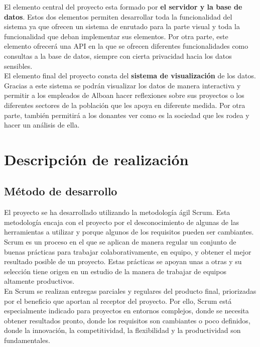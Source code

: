 El elemento central del proyecto esta formado por \textbf{el servidor y la base de datos}. Estos dos elementos permiten desarrollar toda la funcionalidad del sistema ya que ofrecen un sistema de enrutado para la parte visual y toda la funcionalidad que deban implementar sus elementos. Por otra parte, este elemento ofrecerá una API en la que se ofrecen diferentes funcionalidades como consultas a la base de datos, siempre con cierta privacidad hacia los datos sensibles.\\

El elemento final del proyecto consta del \textbf{sistema de visualización} de los datos. Gracias a este sistema se podrán visualizar los datos de manera interactiva y permitir a los empleados de Alboan hacer reflexiones sobre sus proyectos o los diferentes sectores de la población que les apoya en diferente medida. Por otra parte, también permitirá a los donantes ver como es la sociedad que les rodea y hacer un análisis de ella.

\section{Descripción de realización}

\subsection{Método de desarrollo}
El proyecto se ha desarrollado utilizando la metodología ágil Scrum. Esta metodología encaja con el proyecto por el desconocimiento de algunas de las herramientas a utilizar y porque algunos de los requisitos pueden ser cambiantes.\\

Scrum es un proceso en el que se aplican de manera regular un conjunto de buenas prácticas para trabajar colaborativamente, en equipo, y obtener el mejor resultado posible de un proyecto. Estas prácticas se apoyan unas a otras y su selección tiene origen en un estudio de la manera de trabajar de equipos altamente productivos.\\

En Scrum se realizan entregas parciales y regulares del producto final, priorizadas por el beneficio que aportan al receptor del proyecto. Por ello, Scrum está especialmente indicado para proyectos en entornos complejos, donde se necesita obtener resultados pronto, donde los requisitos son cambiantes o poco definidos, donde la innovación, la competitividad, la flexibilidad y la productividad son fundamentales.\\

